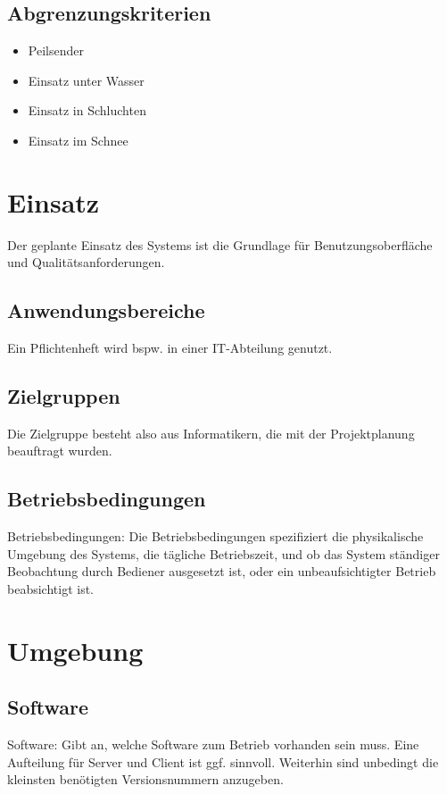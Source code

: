 \documentclass[a4paper]{scrreprt}
\begin{document}
\section{Abgrenzungskriterien}
\begin{itemize}
	\item Peilsender
	\item Einsatz unter Wasser
	\item Einsatz in Schluchten
	\item Einsatz im Schnee
\end{itemize}
 
\chapter{Einsatz}
Der geplante Einsatz des Systems ist die Grundlage für Benutzungsoberfläche und
Qualitätsanforderungen.
 
\section{Anwendungsbereiche}
Ein Pflichtenheft wird bspw. in einer IT-Abteilung genutzt.
 
\section{Zielgruppen}
Die Zielgruppe besteht also aus Informatikern, die mit der Projektplanung
beauftragt wurden.
 
\section{Betriebsbedingungen}
Betriebsbedingungen: Die Betriebsbedingungen spezifiziert die physikalische
Umgebung des Systems, die tägliche Betriebszeit, und ob das System ständiger
Beobachtung durch Bediener ausgesetzt ist, oder ein unbeaufsichtigter Betrieb
beabsichtigt ist.
 
\chapter{Umgebung}
 
\section{Software}
Software: Gibt an, welche Software zum Betrieb vorhanden sein muss. Eine
Aufteilung für Server und Client ist ggf. sinnvoll. Weiterhin sind unbedingt die
kleinsten benötigten Versionsnummern anzugeben.
 
\end{document}
